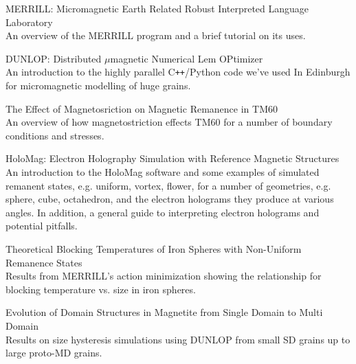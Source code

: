 \documentclass[11pt]{article}
\newenvironment{resumeSubSectionBody}{
    \par
    \vspace{-0.8\parskip}
    \begin{small}
    \par
} {
    \par
    \end{small}
    \par
}
\begin{document}
\begin{resumeSubSectionBody}
\begin{description}
    \item{
        MERRILL: Micromagnetic Earth Related Robust Interpreted Language
        Laboratory
    }\\
    An overview of the MERRILL program and a brief tutorial on its uses.

    \item{DUNLOP: Distributed $\mu$magnetic Numerical Lem OPtimizer}\\
        An introduction to the highly parallel C\verb!++!/Python code we've used
        In Edinburgh for micromagnetic modelling of huge grains.

    \item{The Effect of Magnetosriction on Magnetic Remanence in TM60}\\
        An overview of how magnetostriction effects TM60 for a number of
        boundary conditions and stresses.

    \item{
        HoloMag: Electron Holography Simulation with Reference Magnetic
        Structures
    }\\
        An introduction to the HoloMag software and some examples of simulated
        remanent states, e.g. uniform, vortex, flower,
        for a number of geometries, e.g. sphere, cube, octahedron,
        and the electron holograms they produce at various angles.
        In addition, a general guide to interpreting electron holograms
        and potential pitfalls.

    \item{
        Theoretical Blocking Temperatures of Iron Spheres with Non-Uniform
        Remanence States
    }\\
        Results from MERRILL's action minimization showing the relationship
        for blocking temperature vs. size in iron spheres.

    \item{
        Evolution of Domain Structures in Magnetite from Single Domain to Multi
        Domain
    }\\
        Results on size hysteresis simulations using DUNLOP from small
        SD grains up to large proto-MD grains.

\end{description}
\end{resumeSubSectionBody}
\end{document}

